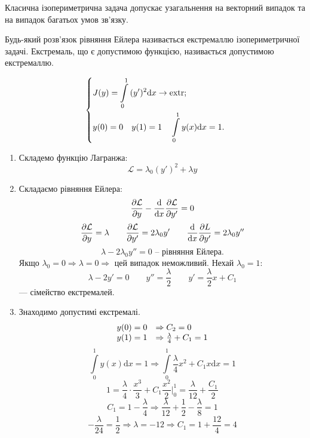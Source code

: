 \begin{remark}
  Класична ізопериметрична задача допускає узагальнення на векторний випадок та  на випадок багатьох умов зв'язку.
\end{remark}
\begin{defo}
 Будь-який розв'язок рівняння Ейлера називається екстремаллю ізопериметричної задачі. Екстремаль, що є допустимою функцією, називається допустимою екстремаллю.
\end{defo}
\begin{example}
 $$
 \begin{dcases}
  J(y) =  \int\limits_{0}^{1}{(y')^2 \mathrm{d} x} \to \mathrm{extr};\\
  y(0) = 0 \quad y(1) = 1 \quad  \int\limits_{0}^{1}{y(x) \mathrm{d} x} = 1.
 \end{dcases}
 $$
 \begin{enumerate}
   \item Складемо функцію Лагранжа:
   $$
   \mathcal{L} = \lambda_0 (y')^2 + \lambda y
   $$
   \item Складаємо рівняння Ейлера:
   $$
   \frac{\partial \mathcal{L}}{\partial y}  - \frac{\mathrm{d}}{\mathrm{d} x} \frac{\partial \mathcal{L}}{\partial y'} = 0
   $$
   $$
   \frac{\partial \mathcal{L}}{ \partial y} = \lambda \qquad \frac{\partial \mathcal{L}}{\partial y'} = 2 \lambda_0 y' \qquad
   \frac{\mathrm{d}}{\mathrm{d} x } \frac{\partial L}{\partial y'} = 2 \lambda_0 y''
   $$
   $$
   \lambda - 2 \lambda_0 y'' = 0 \text{ -- рівняння Ейлера.}
   $$
   Якщо $\lambda_0 = 0 \Rightarrow \lambda = 0 \Rightarrow$ цей випадок неможливий. Нехай $\lambda_0 = 1$:
   $$
   \lambda - 2 y' = 0 \qquad y'' = \frac{\lambda}{2} \qquad y' = \frac{\lambda}{2} x + C_1
   $$
    --- сімейство екстремалей.
   \item Знаходимо допустимі екстремалі.
   $$
\begin{array}{r l}
y(0) = 0 &\Rightarrow C_2 = 0\\
y(1) = 1 & \Rightarrow \frac{\lambda}{4} + C_1 = 1
\end{array}
   $$
   $$
    \int\limits_{0}^{1}{y(x) \mathrm{d} x} = 1 \Rightarrow  \int\limits_{0}^{1}{
    \frac{\lambda}{4}x^2 + C_1 x \mathrm{d} x = 1
    }
   $$
   $$
   1 = \frac{\lambda}{4} \cdot \frac{x^3}{3} + C_1 \frac{x^2}{2}\bigg|_0^1 = \frac{\lambda}{12} + \frac{C_1}{2}
   $$
   $$
   C_1 = 1 - \frac{\lambda}{4} \Longrightarrow \frac{\lambda}{12} + \frac{1}{2} - \frac{\lambda}{8} = 1
   $$
   $$
   - \frac{\lambda}{24} = \frac{1}{2} \Longrightarrow \lambda = -12 \Longrightarrow C_1 = 1 + \frac{12}{4} = 4
$$
\end{enumerate}
\end{example}
